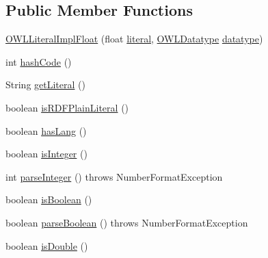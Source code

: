 \subsection*{Public Member Functions}
\begin{DoxyCompactItemize}
\item 
\hyperlink{classuk_1_1ac_1_1manchester_1_1cs_1_1owl_1_1owlapi_1_1_o_w_l_literal_impl_float_a74dd27f8a2ef7cbc8fb424ccf706bce7}{O\-W\-L\-Literal\-Impl\-Float} (float \hyperlink{classuk_1_1ac_1_1manchester_1_1cs_1_1owl_1_1owlapi_1_1_o_w_l_literal_impl_float_ac548af9523861b98ff9a22da94e38f7e}{literal}, \hyperlink{interfaceorg_1_1semanticweb_1_1owlapi_1_1model_1_1_o_w_l_datatype}{O\-W\-L\-Datatype} \hyperlink{classuk_1_1ac_1_1manchester_1_1cs_1_1owl_1_1owlapi_1_1_o_w_l_literal_impl_float_af7c5c2a2b36b72ee71bef27ef587e65d}{datatype})
\item 
int \hyperlink{classuk_1_1ac_1_1manchester_1_1cs_1_1owl_1_1owlapi_1_1_o_w_l_literal_impl_float_a54f1621aaba4145939d210c70d14ca0f}{hash\-Code} ()
\item 
String \hyperlink{classuk_1_1ac_1_1manchester_1_1cs_1_1owl_1_1owlapi_1_1_o_w_l_literal_impl_float_a801c642f78c6784c9a9d347e734d595f}{get\-Literal} ()
\item 
boolean \hyperlink{classuk_1_1ac_1_1manchester_1_1cs_1_1owl_1_1owlapi_1_1_o_w_l_literal_impl_float_a715cbeaf2e9285efdeae966a4d1509d2}{is\-R\-D\-F\-Plain\-Literal} ()
\item 
boolean \hyperlink{classuk_1_1ac_1_1manchester_1_1cs_1_1owl_1_1owlapi_1_1_o_w_l_literal_impl_float_ad61643b34574e021bb6ef933730f402e}{has\-Lang} ()
\item 
boolean \hyperlink{classuk_1_1ac_1_1manchester_1_1cs_1_1owl_1_1owlapi_1_1_o_w_l_literal_impl_float_ad9b5bbb799f42637fb0171cd2a123287}{is\-Integer} ()
\item 
int \hyperlink{classuk_1_1ac_1_1manchester_1_1cs_1_1owl_1_1owlapi_1_1_o_w_l_literal_impl_float_ae14d637e8d90f158ac9a7aef8584def4}{parse\-Integer} ()  throws Number\-Format\-Exception 
\item 
boolean \hyperlink{classuk_1_1ac_1_1manchester_1_1cs_1_1owl_1_1owlapi_1_1_o_w_l_literal_impl_float_a22308208ee03e2f70d6d942d36278fb7}{is\-Boolean} ()
\item 
boolean \hyperlink{classuk_1_1ac_1_1manchester_1_1cs_1_1owl_1_1owlapi_1_1_o_w_l_literal_impl_float_a0b978f49a0251886a3a8bbaaa9a79f9b}{parse\-Boolean} ()  throws Number\-Format\-Exception 
\item 
boolean \hyperlink{classuk_1_1ac_1_1manchester_1_1cs_1_1owl_1_1owlapi_1_1_o_w_l_literal_impl_float_ad7367158776a869c168e688f311ca871}{is\-Double} ()

\end{DoxyCompactItemize}
